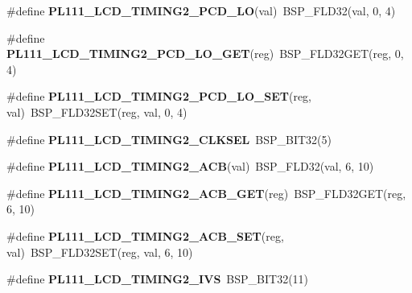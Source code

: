 \begin{DoxyCompactItemize}
\item 
\mbox{\label{arm-pl111-regs_8h_adecdb7031577289f397cb0737cba5fac}} 
\#define {\bfseries P\+L111\+\_\+\+L\+C\+D\+\_\+\+T\+I\+M\+I\+N\+G2\+\_\+\+P\+C\+D\+\_\+\+LO}(val)~B\+S\+P\+\_\+\+F\+L\+D32(val, 0, 4)
\item 
\mbox{\label{arm-pl111-regs_8h_add7d8147022d0b7935d39749a4e129ce}} 
\#define {\bfseries P\+L111\+\_\+\+L\+C\+D\+\_\+\+T\+I\+M\+I\+N\+G2\+\_\+\+P\+C\+D\+\_\+\+L\+O\+\_\+\+G\+ET}(reg)~B\+S\+P\+\_\+\+F\+L\+D32\+G\+ET(reg, 0, 4)
\item 
\mbox{\label{arm-pl111-regs_8h_a439250af48ee6e81899435f9bb0fda33}} 
\#define {\bfseries P\+L111\+\_\+\+L\+C\+D\+\_\+\+T\+I\+M\+I\+N\+G2\+\_\+\+P\+C\+D\+\_\+\+L\+O\+\_\+\+S\+ET}(reg,  val)~B\+S\+P\+\_\+\+F\+L\+D32\+S\+ET(reg, val, 0, 4)
\item 
\mbox{\label{arm-pl111-regs_8h_a2de2d2c21091f4ac266a1a5921757e96}} 
\#define {\bfseries P\+L111\+\_\+\+L\+C\+D\+\_\+\+T\+I\+M\+I\+N\+G2\+\_\+\+C\+L\+K\+S\+EL}~B\+S\+P\+\_\+\+B\+I\+T32(5)
\item 
\mbox{\label{arm-pl111-regs_8h_a17d93cf6136571901ba78885116d7783}} 
\#define {\bfseries P\+L111\+\_\+\+L\+C\+D\+\_\+\+T\+I\+M\+I\+N\+G2\+\_\+\+A\+CB}(val)~B\+S\+P\+\_\+\+F\+L\+D32(val, 6, 10)
\item 
\mbox{\label{arm-pl111-regs_8h_a2558d6a7124438f5c8a3b860ad9a4188}} 
\#define {\bfseries P\+L111\+\_\+\+L\+C\+D\+\_\+\+T\+I\+M\+I\+N\+G2\+\_\+\+A\+C\+B\+\_\+\+G\+ET}(reg)~B\+S\+P\+\_\+\+F\+L\+D32\+G\+ET(reg, 6, 10)
\item 
\mbox{\label{arm-pl111-regs_8h_a902a22119c3ba1ada18813732a77ff0f}} 
\#define {\bfseries P\+L111\+\_\+\+L\+C\+D\+\_\+\+T\+I\+M\+I\+N\+G2\+\_\+\+A\+C\+B\+\_\+\+S\+ET}(reg,  val)~B\+S\+P\+\_\+\+F\+L\+D32\+S\+ET(reg, val, 6, 10)
\item 
\mbox{\label{arm-pl111-regs_8h_ae6072f0a3fdc5259242761407d57e7b1}} 
\#define {\bfseries P\+L111\+\_\+\+L\+C\+D\+\_\+\+T\+I\+M\+I\+N\+G2\+\_\+\+I\+VS}~B\+S\+P\+\_\+\+B\+I\+T32(11)
\item 

\end{DoxyCompactItemize}
